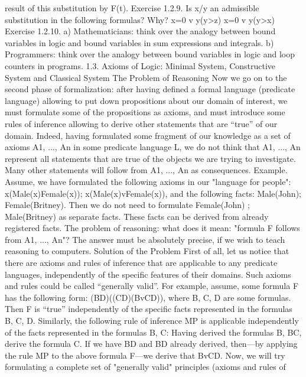 result of this substitution by F(t).
Exercise 1.2.9. Is x/y an admissible substitution in the following formulas? Why?
x=0 v \exists y(y>z)
x=0 v \exists y(y>x)
Exercise 1.2.10. a) Mathematicians: think over the analogy between bound variables in logic and bound
variables in sum expressions and integrals.
b) Programmers: think over the analogy between bound variables in logic and loop counters in programs.
1.3. Axioms of Logic: Minimal System, Constructive System and Classical System
The Problem of Reasoning
Now we go on to the second phase of formalization: after having defined a formal language (predicate
language) allowing to put down propositions about our domain of interest, we must formulate some of the
propositions as axioms, and must introduce some rules of inference allowing to derive other statements
that are ``true'' of our domain.
Indeed, having formulated some fragment of our knowledge as a set of axioms A1, ..., An in some
predicate language L, we do not think that A1, ..., An represent all statements that are true of the objects
we are trying to investigate. Many other statements will follow from A1, ..., An as consequences.
Example. Assume, we have formulated the following axioms in our "language for people":
\forall x\neg (Male(x)\AND Female(x)); \forall x(Male(x)vFemale(x)), and the following facts: Male(John);
Female(Britney). Then we do not need to formulate \neg Female(John) ; \neg Male(Britney) as separate facts.
These facts can be derived from already registered facts.
The problem of reasoning: what does it mean: "formula F follows from A1, ..., An"? The answer must be
absolutely precise, if we wish to teach reasoning to computers.
Solution of the Problem
First of all, let us notice that there are axioms and rules of inference that are applicable to any predicate
languages, independently of the specific features of their domains. Such axioms and rules could be called
``generally valid''.
For example, assume, some formula F has the following form:
(B\IMPLIES D)\IMPLIES ((C\IMPLIES D)\IMPLIES (BvC\IMPLIES D)),
where B, C, D are some formulas. Then F is ``true'' independently of the specific facts represented in the
formulas B, C, D.
Similarly, the following rule of inference MP is applicable independently of the facts represented in the
formulas B, C:
Having derived the formulas B, B\IMPLIES C, derive the formula C.
If we have B\IMPLIES D and B\IMPLIES D already derived, then---by applying the rule MP to the above formula F---we
derive that BvC\IMPLIES D.
Now, we will try formulating a complete set of "generally valid" principles (axioms and rules of
